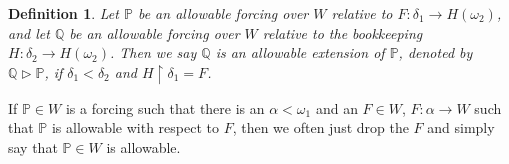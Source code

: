 \documentclass[a4paper,11pt]{article}
\newtheorem{definition}[theorem]{Definition}
\newcommand{\forceP}{\mathbb{P}}
\newcommand{\forceQ}{\mathbb{Q}}
\begin{document}
\begin{definition}
Let $\forceP$ be an allowable forcing over $W$ relative to $F: \delta_1 \rightarrow H(\omega_2)$, and let $\forceQ$ be an allowable forcing over $W$ relative to the bookkeeping $H: \delta_2 \rightarrow H(\omega_2)$. Then we say $\forceQ$ is an allowable extension of $\forceP$, denoted by $\forceQ \triangleright \forceP$, if $\delta_1 < \delta_2$ and $H \upharpoonright \delta_1 = F$.
\end{definition}



If $\forceP \in W$ is a forcing such that there is an $\alpha < \omega_1$ and an $F \in W$, $F: \alpha \rightarrow W$ such that $\forceP$ is allowable with respect to $F$, then we often just drop the $F$ and simply say that $\forceP \in W$ is allowable.
\end{document}
